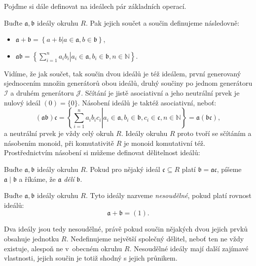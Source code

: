 \documentclass [12pt]{report}
\begin{document}
Pojďme si dále definovat na ideálech pár základních operací.
\begin{definice}\label{soucindef}
Buďte $\mathfrak{a},\mathfrak{b}$ ideály okruhu $R$. Pak jejich součet a součin definujeme následovně:
\begin{itemize}
\item $\mathfrak{a}+\mathfrak{b}  =\left\lbrace  a+b \vert a \in \mathfrak{a}, b \in \mathfrak{b} \right\rbrace$,
\item $\mathfrak{a} \mathfrak{b} =\left\lbrace \left. \sum_{i=1}^{n} a_i b_i \right \vert a_i \in \mathfrak{a}, b_i \in \mathfrak{b}, n \in \mathbb{N} \right\rbrace$.
\end{itemize}
\end{definice}


Vidíme, že jak součet, tak součin dvou ideálů je též ideálem, první generovaný sjednocením množin generátorů obou ideálů, druhý součiny po jednom generátoru $\mathcal{I}$ a druhém generátoru $\mathcal{J}$. Sčítání je jistě asociativní a jeho neutrální prvek je nulový ideál $(0) = \lbrace 0 \rbrace$. Násobení ideálů je taktéž asociativní, neboť: $$(\mathfrak{a} \mathfrak{b}) \mathfrak{c}= \left\lbrace \left. \sum_{i=1}^{n} a_i b_i c_i \right\vert a_i \in \mathfrak{a}, b_i \in \mathfrak{b}, c_i \in \mathfrak{c}, n \in \mathbb{N}  \right\rbrace = \mathfrak{a}(\mathfrak{b}\mathfrak{c}),$$ a neutrální prvek je vždy celý okruh $R$. Ideály okruhu $R$ proto tvoří se sčítáním a násobením monoid, při komutativitě $R$ je monoid komutativní též.\\

Prostřednictvím násobení si můžeme definovat dělitelnost ideálů:
\begin{znaceni}
Buďte $\mathfrak{a},\mathfrak{b}$ ideály okruhu $R$. Pokud pro nějaký ideál $\mathfrak{c} \subseteq R$ platí $\mathfrak{b} = \mathfrak{a} \mathfrak{c}$, píšeme $\mathfrak{a} \mid \mathfrak{b}$ a říkáme, že $\mathfrak{a}$ \textit{dělí} $\mathfrak{b}$.
\end{znaceni}

\begin{definice}
Buďte $\mathfrak{a},\mathfrak{b}$ ideály okruhu $R$. Tyto ideály nazveme \textit{nesoudělné}, pokud platí rovnost ideálů:
\begin{equation*}
\mathfrak{a}+\mathfrak{b} = (1).
\end{equation*}
\end{definice}

Dva ideály jsou tedy nesoudělné, právě pokud součin nějakých dvou jejich prvků obsahuje jednotku $R$. Nedefinujeme největší společný dělitel, neboť ten ne vždy existuje, alespoň ne v~obecném okruhu $R$. Nesoudělné ideály mají další zajímavé vlastnosti, jejich součin je totiž shodný s jejich průnikem.\\ 
\end{document}
